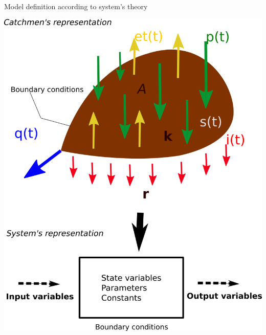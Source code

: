 \documentclass[8pt]{beamer}
\begin{document}
\begin{frame}{Model definition according to system's theory}
\begin{minipage}{0.495\textwidth}
    \includegraphics[height=0.8\textheight, keepaspectratio]{fi2l1.png}
\end{minipage}
\end{frame}
\end{document}
